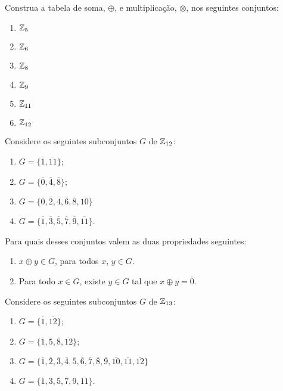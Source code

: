 \documentclass[12pt]{exam}
\begin{document}
   \questao{} Construa a tabela de soma, $\oplus$, e multiplicação, $\otimes$, nos seguintes conjuntos:
\begin{multicols}{3}
    \begin{enumerate}[label=({\alph*})]
        \item $\mathbb{Z}_5$
        \item $\mathbb{Z}_6$
        \item $\mathbb{Z}_8$
        \item $\mathbb{Z}_9$
        \item $\mathbb{Z}_{11}$
        \item $\mathbb{Z}_{12}$
    \end{enumerate}
\end{multicols}

\vspace{.3cm}

\questao{} Considere os seguintes subconjuntos $G$ de $\mathbb{Z}_{12}$:
\begin{multicols}{2}
    \begin{enumerate}[label=({\alph*})]
        \item $G=\{\overline{1},\overline{11}\}$;

        \item $G=\{\overline{0},\overline{4},\overline{8}\}$;

        \item $G=\{\overline{0},\overline{2},\overline{4},\overline{6},\overline{8},\overline{10}\}$
        \item $G=\{\overline{1}, \overline{3},\overline{5},\overline{7},\overline{9},\overline{11}\}$.
    \end{enumerate}
\end{multicols}

Para quais desses conjuntos valem as duas propriedades seguintes:
\begin{enumerate}[label=({\roman*})]
    \item $x \oplus y \in G$, para todos $x$, $y \in G$.
    \item Para todo $x \in G$, existe $y \in G$ tal que $x \oplus y = \overline{0}$.
\end{enumerate}

\vspace{.3cm}

\questao{} Considere os seguintes subconjuntos $G$ de $\mathbb{Z}_{13}$:
\begin{multicols}{2}
    \begin{enumerate}[label=({\alph*})]
        \item $G=\{\overline{1},\overline{12}\}$;

        \item $G=\{\overline{1},\overline{5},\overline{8},\overline{12}\}$;

        \item $G=\{\overline{1},\overline{2},\overline{3},\overline{4}, \overline{5},\overline{6},\overline{7},
         \overline{8},\overline{9},\overline{10},\overline{11},\overline{12}\}$
        \item $G=\{\overline{1}, \overline{3},\overline{5},\overline{7},\overline{9},\overline{11}\}$.
    \end{enumerate}
\end{multicols}
\end{document}
